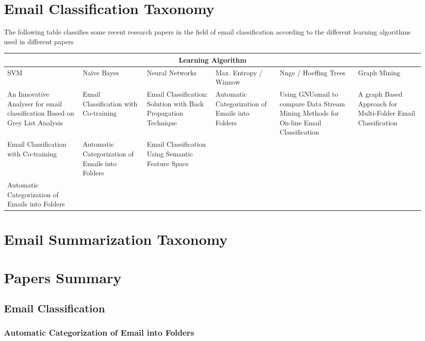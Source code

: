 \documentclass[12pt]{article}
\begin{document}
\section{Email Classification Taxonomy}
The following table classifies some recent research papers in the field of email 
classification according to the different learning algorithms used in different papers


\begin{tabular}{|p{2cm}|p{2cm}|p{2cm}|p{2cm}|p{2cm}|p{2cm}|}
\hline
\multicolumn{6}{|c|}{Learning Algorithm} \\
\hline
SVM & Naïve Bayes & Neural Networks & Max. Entropy / Winnow & Nnge / Hoeffing Trees & Graph Mining \\ \hline
An Innovative Analyser for email classification Based on Grey List Analysis &
Email Classification with Co-training &
Email Classification: Solution with Back Propagation Technique & 
Automatic Categorization of Emails into Folders &
Using GNUsmail to compare Data Stream Mining Methods for On-line Email Classification &
A graph Based Approach for Multi-Folder Email Classification \\ \hline

Email Classification with Co-training &
Automatic Categorization of Emails into Folders &
Email Classification Using Semantic Feature Space & 
&
&
 \\ \hline

Automatic Categorization of Emails into Folders &
&
& 
&
&

 \\
\hline
\end{tabular}

\section{Email Summarization Taxonomy}

\section{Papers Summary}
\subsection{Email Classification}

\subsubsection{Automatic Categorization of Email into Folders \cite{RON04}}
\end{document}

